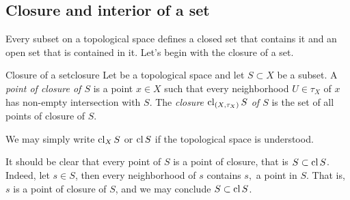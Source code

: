 \subsection{Closure and interior of a set}
Every subset on a topological space defines a closed set that contains it and an open set that is contained in it. Let's begin with the closure of a set.
\begin{definition}{Closure of a set}{closure}
    Let  be a topological space and let \(S \subset X\) be a subset. A \emph{point of closure of \(S\)} is a point \(x \in X\) such that every neighborhood \(U\in\tau_X\) of \(x\) has non-empty intersection with \(S\). The \emph{closure \(\operatorname{cl}_{(X, \tau_X)}{S}\) of \(S\)} is the set of all points of closure of \(S\).
\end{definition}
\begin{remark}
    We may simply write \(\operatorname{cl}_X S\) or \(\operatorname{cl} S\) if the topological space is understood.
\end{remark}
\begin{remark}
    It should be clear that every point of \(S\) is a point of closure, that is \(S \subset \operatorname{cl}{S}\). Indeed, let \(s \in S\), then every neighborhood of \(s\) contains \(s,\) a point in \(S\). That is, \(s\) is a point of closure of \(S\), and we may conclude \(S \subset \operatorname{cl} S\).
\end{remark}

